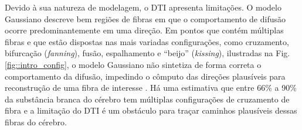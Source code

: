 \documentclass[
    12pt,                %
    oneside,            %
    a4paper,            %
    english,            %
    french,                %
    spanish,            %
    brazil                %
    ]{abntex2}
\begin{document}

Devido à sua natureza de modelagem, o DTI apresenta limitações. O modelo Gaussiano descreve bem regiões de fibras em que o comportamento de difusão ocorre predominantemente em uma direção. Em pontos que contém múltiplas fibras e que estão dispostas nas mais variadas configurações, como cruzamento, bifurcação (\textit{fanning}), fusão, espalhamento e ``beijo'' (\textit{kissing}), ilustradas na Fig. \ref{fig::intro_config}, o modelo Gaussiano não sintetiza de forma correta o comportamento da difusão, impedindo o cômputo das direções plausíveis para reconstrução de uma fibra de interesse \cite{fillard2011, daducci2014}. Há uma estimativa que entre 66\% a 90\% da substância branca do cérebro tem múltiplas configurações de cruzamento de fibra \cite{descoteaux2015} e a limitação do DTI é um obstáculo para traçar caminhos plausíveis dessas fibras do cérebro.
\end{document}
